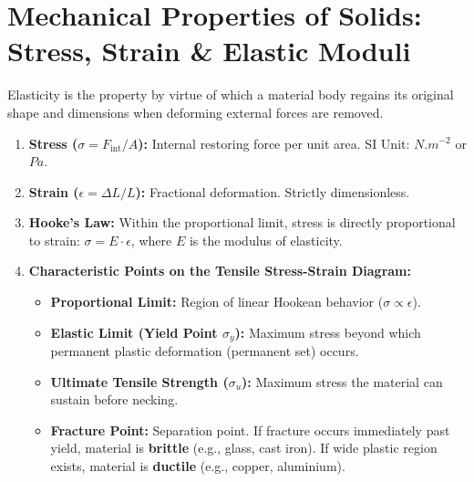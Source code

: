 \documentclass[10pt,a4paper]{article}
\begin{document}
\section{Mechanical Properties of Solids: Stress, Strain \& Elastic Moduli}

\begin{conceptbox}
Elasticity is the property by virtue of which a material body regains its original shape and dimensions when deforming external forces are removed.
\begin{enumerate}[leftmargin=*]
  \item \textbf{Stress ($\sigma = F_{\text{int}}/A$):} Internal restoring force per unit area. SI Unit: $\si{N.m^{-2}}$ or $\si{Pa}$.
  \item \textbf{Strain ($\epsilon = \Delta L/L$):} Fractional deformation. Strictly dimensionless.
  \item \textbf{Hooke's Law:} Within the proportional limit, stress is directly proportional to strain: $\sigma = E \cdot \epsilon$, where $E$ is the modulus of elasticity.
  \item \textbf{Characteristic Points on the Tensile Stress-Strain Diagram:}
  \begin{itemize}
    \item \textbf{Proportional Limit:} Region of linear Hookean behavior ($\sigma \propto \epsilon$).
    \item \textbf{Elastic Limit (Yield Point $\sigma_y$):} Maximum stress beyond which permanent plastic deformation (permanent set) occurs.
    \item \textbf{Ultimate Tensile Strength ($\sigma_u$):} Maximum stress the material can sustain before necking.
    \item \textbf{Fracture Point:} Separation point. If fracture occurs immediately past yield, material is \textbf{brittle} (e.g., glass, cast iron). If wide plastic region exists, material is \textbf{ductile} (e.g., copper, aluminium).
  \end{itemize}
\end{enumerate}
\end{conceptbox}
\end{document}

